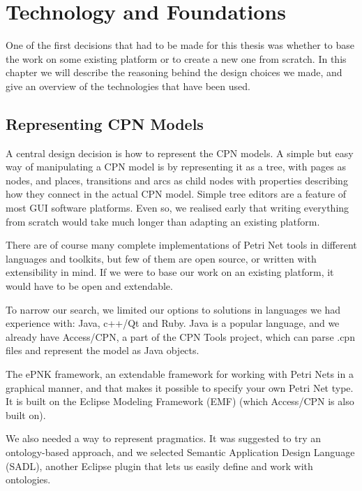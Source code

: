 \chapter{Technology and Foundations}
\label{chap:technology}

One of the first decisions that had to be made for this thesis was whether to
base the work on some existing platform or to create a new one from
scratch. In this chapter we will describe the reasoning behind the
design choices we made, and give an overview of the technologies that have been
used.


\section{Representing CPN Models}
	
	A central design decision is how to represent the CPN models. A simple
	but easy way of manipulating a CPN model is by representing it as a tree, with pages as
	nodes, and places, transitions and arcs as child nodes with properties
	describing how they connect in the actual CPN model.
	Simple tree editors are a feature of most GUI software platforms.
	Even so, we realised early that writing everything from scratch would take
	much longer than adapting an existing platform.

	There are of course many complete implementations of Petri Net tools in
	different languages and toolkits, but few of them are open source, or written
	with extensibility in mind. If we were to base our work on an existing
	platform, it would have to be open and extendable. 
	
	To narrow our search, we limited our options to solutions in
	languages we had experience with: Java, c++/Qt and Ruby. Java is a popular
	language, and we already have Access/CPN, a part of the CPN Tools project,
	which can parse .cpn files and represent the model as Java objects. 
	
	The ePNK framework, an extendable framework for working with Petri Nets in a
	graphical manner, and that makes it possible to specify your own Petri Net
	type. It is built on the Eclipse Modeling Framework (EMF) (which Access/CPN is
	also built on).
	
	We also needed a way to represent pragmatics. It was suggested to try an
	ontology-based approach, and we selected Semantic Application Design Language
	(SADL), another Eclipse plugin that lets us easily define and work with ontologies.
	
	
